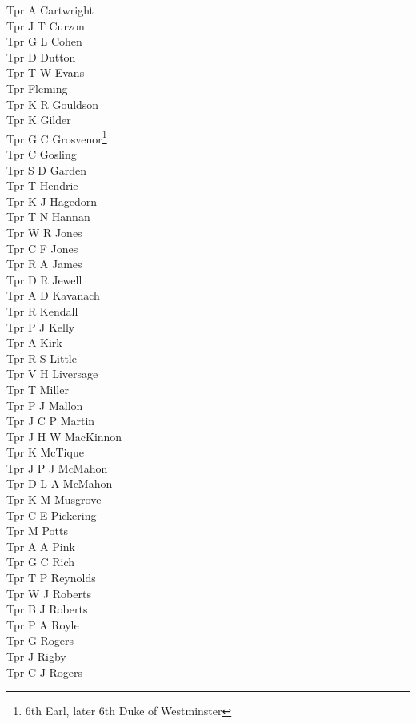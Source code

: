 \documentclass[a4paper,7pt]{book}
\begin{document}
\begin{multicols}{4}
  Tpr A Cartwright \\
  Tpr J T Curzon \\
  Tpr G L Cohen \\
  Tpr D Dutton \\
  Tpr T W Evans \\
  Tpr Fleming \\
  Tpr K R Gouldson \\
  Tpr K Gilder \\
  Tpr G C Grosvenor\footnote{6th Earl, later 6th Duke of Westminster} \\
  Tpr C Gosling \\
  Tpr S D Garden \\
  Tpr T Hendrie \\
  Tpr K J Hagedorn \\
  Tpr T N Hannan \\
  Tpr W R Jones \\
  Tpr C F Jones \\
  Tpr R A James \\
  Tpr D R Jewell \\
  Tpr A D Kavanach \\
  Tpr R Kendall \\
  Tpr P J Kelly \\
  Tpr A Kirk \\
  Tpr R S Little \\
  Tpr V H Liversage \\
  Tpr T Miller \\
  Tpr P J Mallon \\
  Tpr J C P Martin \\
  Tpr J H W MacKinnon \\
  Tpr K McTique \\
  Tpr J P J McMahon \\
  Tpr D L A McMahon \\
  Tpr K M Musgrove \\
  Tpr C E Pickering \\
  Tpr M Potts \\
  Tpr A A Pink \\
  Tpr G C Rich \\
  Tpr T P Reynolds \\
  Tpr W J Roberts \\
  Tpr B J Roberts \\
  Tpr P A Royle \\
  Tpr G Rogers \\
  Tpr J Rigby \\
  Tpr C J Rogers \\

\end{multicols}
\end{document}
